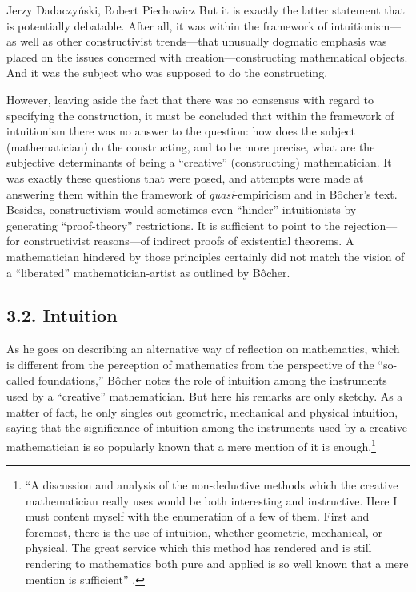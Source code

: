 \begin{artengenv}{Jerzy Dadaczyński, Robert Piechowicz}
But it is exactly the latter statement that is potentially debatable. After all, it was within the framework of intuitionism---as well as other constructivist trends---that unusually dogmatic emphasis was placed on the issues concerned with creation---constructing mathematical objects. And it was the subject who was supposed to do the constructing.

However, leaving aside the fact that there was no consensus with regard to specifying the construction, it must be concluded that within the framework of intuitionism there was no answer to the question: how does the subject (mathematician) do the constructing, and to be more precise, what are the subjective determinants of being a ``creative'' (constructing) mathematician. It was exactly these questions that were posed, and attempts were made at answering them within the framework of \textit{quasi}-empiricism and in Bôcher's text. Besides, constructivism would sometimes even ``hinder'' intuitionists by generating ``proof-theory'' restrictions. It is sufficient to point to the rejection---for constructivist reasons---of indirect proofs of existential theorems. A mathematician hindered by those principles certainly did not match the vision of a ``liberated'' mathematician-artist as outlined by Bôcher.

\subsection{3.2. Intuition}

As he goes on describing an alternative way of reflection on mathematics, which is different from the perception of mathematics from the perspective of the ``so-called foundations,'' Bôcher notes the role of intuition among the instruments used by a ``creative'' mathematician. But here his remarks are only sketchy. As a matter of fact, he only singles out geometric, mechanical and physical intuition, saying that the significance of intuition among the instruments used by a creative mathematician is so popularly known that a mere mention of it is enough.\footnote{``A discussion and analysis of the non-deductive methods which the creative mathematician really uses would be both interesting and instructive. Here I must content myself with the enumeration of a few of them. First and foremost, there is the use of intuition, whether geometric, mechanical, or physical. The great service which this method has rendered and is still rendering to mathematics both pure and applied is so well known that a mere mention is sufficient''
\parencite[][p.134]{bocher_fundamental_1904}.%
}


\end{artengenv}
